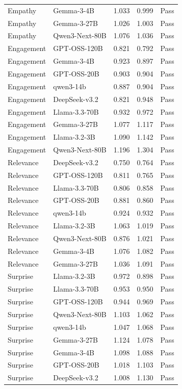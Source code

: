 \begin{table}[t]
{\begin{tabular}{llrrl}
Empathy & Gemma-3-4B & 1.033 & 0.999 & Pass \\
Empathy & Gemma-3-27B & 1.026 & 1.003 & Pass \\
Empathy & Qwen3-Next-80B & 1.076 & 1.036 & Pass \\
Engagement & GPT-OSS-120B & 0.821 & 0.792 & Pass \\
Engagement & Gemma-3-4B & 0.923 & 0.897 & Pass \\
Engagement & GPT-OSS-20B & 0.903 & 0.904 & Pass \\
Engagement & qwen3-14b & 0.887 & 0.904 & Pass \\
Engagement & DeepSeek-v3.2 & 0.821 & 0.948 & Pass \\
Engagement & Llama-3.3-70B & 0.932 & 0.972 & Pass \\
Engagement & Gemma-3-27B & 1.077 & 1.117 & Pass \\
Engagement & Llama-3.2-3B & 1.090 & 1.142 & Pass \\
Engagement & Qwen3-Next-80B & 1.196 & 1.304 & Pass \\
Relevance & DeepSeek-v3.2 & 0.750 & 0.764 & Pass \\
Relevance & GPT-OSS-120B & 0.811 & 0.765 & Pass \\
Relevance & Llama-3.3-70B & 0.806 & 0.858 & Pass \\
Relevance & GPT-OSS-20B & 0.881 & 0.860 & Pass \\
Relevance & qwen3-14b & 0.924 & 0.932 & Pass \\
Relevance & Llama-3.2-3B & 1.063 & 1.019 & Pass \\
Relevance & Qwen3-Next-80B & 0.876 & 1.021 & Pass \\
Relevance & Gemma-3-4B & 1.076 & 1.082 & Pass \\
Relevance & Gemma-3-27B & 1.036 & 1.091 & Pass \\
Surprise & Llama-3.2-3B & 0.972 & 0.898 & Pass \\
Surprise & Llama-3.3-70B & 0.953 & 0.950 & Pass \\
Surprise & GPT-OSS-120B & 0.944 & 0.969 & Pass \\
Surprise & Qwen3-Next-80B & 1.103 & 1.062 & Pass \\
Surprise & qwen3-14b & 1.047 & 1.068 & Pass \\
Surprise & Gemma-3-27B & 1.124 & 1.078 & Pass \\
Surprise & Gemma-3-4B & 1.098 & 1.088 & Pass \\
Surprise & GPT-OSS-20B & 1.018 & 1.103 & Pass \\
Surprise & DeepSeek-v3.2 & 1.008 & 1.130 & Pass \\
\bottomrule
\end{tabular}
}
\end{table}